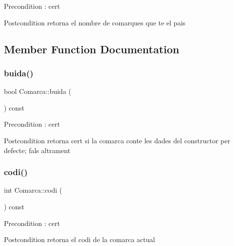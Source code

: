 \begin{DoxyPrecond}{Precondition}
\+: cert 
\end{DoxyPrecond}
\begin{DoxyPostcond}{Postcondition}
retorna el nombre de comarques que te el pais 
\end{DoxyPostcond}


\subsection{Member Function Documentation}
\mbox{\label{classComarca_a5085cd7eeb31a30011e40ca726beb5c9}} 
\subsubsection{\texorpdfstring{buida()}{buida()}}
{\footnotesize\ttfamily bool Comarca\+::buida (\begin{DoxyParamCaption}{ }\end{DoxyParamCaption}) const}

\begin{DoxyPrecond}{Precondition}
\+: cert 
\end{DoxyPrecond}
\begin{DoxyPostcond}{Postcondition}
retorna cert si la comarca conte les dades del constructor per defecte; fals altrament 
\end{DoxyPostcond}
\mbox{\label{classComarca_a53b5d556f592bb3fe49d97a907eb7eae}} 
\subsubsection{\texorpdfstring{codi()}{codi()}}
{\footnotesize\ttfamily int Comarca\+::codi (\begin{DoxyParamCaption}{ }\end{DoxyParamCaption}) const}

\begin{DoxyPrecond}{Precondition}
\+: cert 
\end{DoxyPrecond}
\begin{DoxyPostcond}{Postcondition}
retorna el codi de la comarca actual 
\end{DoxyPostcond}
\mbox{\label{classComarca_a1cc6e6f47984d1a9d611b665a0742899}} 
